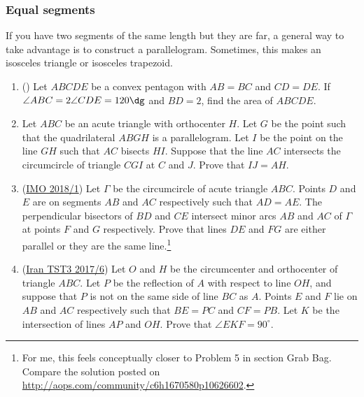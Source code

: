 \documentclass[11pt,paper=letter]{scrartcl}
\begin{document}
\subsubsection*{Equal segments}

If you have two segments of the same length but they are far, a general way to take advantage is to construct a parallelogram. Sometimes, this makes an isosceles triangle or isosceles trapezoid.

\begin{enumerate}
  \item (\cite{A}) Let $ABCDE$ be a convex pentagon with $AB = BC$ and $CD = DE$. If $\angle ABC = 2\angle CDE = 120\dg$ and $BD = 2$, find the area of $ABCDE$. 

  \item Let $ABC$ be an acute triangle with orthocenter $H$. Let $G$ be the point such that the quadrilateral $ABGH$ is a parallelogram. Let $I$ be the point on the line $GH$ such that $AC$ bisects $HI$. Suppose that the line $AC$ intersects the circumcircle of triangle $CGI$ at $C$ and $J$. Prove that $IJ = AH$. %

  \item (\href{https://aops.com/community/c6h1670580}{IMO 2018/1}) Let $\Gamma$ be the circumcircle of acute triangle $ABC$. Points $D$ and $E$ are on segments $AB$ and $AC$ respectively such that $AD = AE$. The perpendicular bisectors of $BD$ and $CE$ intersect minor arcs $AB$ and $AC$ of $\Gamma$ at points $F$ and $G$ respectively. Prove that lines $DE$ and $FG$ are either parallel or they are the same line.\footnote{For me, this feels conceptually closer to Problem 5 in section Grab Bag. Compare the solution posted on \url{http://aops.com/community/c6h1670580p10626602}.}

  \item (\href{https://aops.com/community/c6h1438017}{Iran TST3 2017/6}) Let $O$ and $H$ be the circumcenter and orthocenter of triangle $ABC$. Let $P$ be the reflection of $A$ with respect to line $OH$, and suppose that $P$ is not on the same side of line $BC$ as $A$. Points $E$ and $F$ lie on $AB$ and $AC$ respectively such that $BE = PC$ and $CF = PB$. Let $K$ be the intersection of lines $AP$ and $OH$. Prove that $\angle EKF = 90^{\circ}$. 
\end{enumerate}
\end{document}
